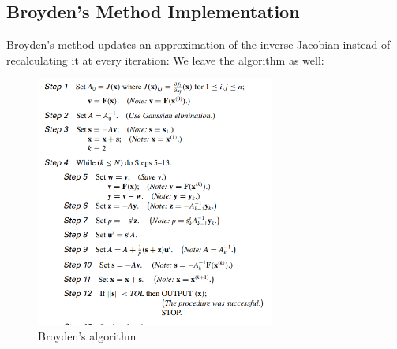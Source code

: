 \documentclass[12pt]{article}
\begin{document}
\subsection{Broyden's Method Implementation}
Broyden's method updates an approximation of the inverse Jacobian instead of recalculating it at every iteration:
We leave the algorithm as well:
\begin{figure}[H]
  \centering
  \includegraphics[width=0.7\textwidth]{image.png}
  \caption{Broyden's algorithm}
  \label{fig:burgers}
\end{figure}
\end{document}
